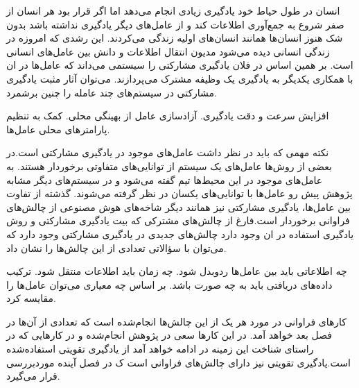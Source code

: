 انسان در طول حیاط خود یادگیری زیادی انجام می‌دهد اما اگر قرار بود هر انسان از  صفر شروع به جمع‌آوری اطلاعات کند و از عامل‌های دیگر یادگیری نداشته باشد بدون شک هنوز انسان‌ها همانند انسان‌های اولیه زندگی می‌کردند. این رشدی که امروزه در زندگی انسانی دیده می‌شود مدیون انتقال اطلاعات و دانش بین عامل‌های انسانی است. بر همین اساس در فلان یادگیری مشارکتی را سیستمی می‌داند که عامل‌ها در ان با همکاری یکدیگر به یادگیری یک وظیفه مشترک می‌پردازند. می‌توان آثار مثبت یادگیری مشارکتی در سیستم‌های چند عامله را چنین برشمرد.

\begin{itemize}\setlength\itemsep{-.5em}
 افزایش سرعت و دقت یادگیری.
 آزادسازی عامل از بهینگی محلی.
 کمک به تنظیم پارامترهای محلی عامل‌ها.
\end{itemize}

نکته مهمی که باید در نظر داشت عامل‌های موجود در یادگیری مشارکتی است.در بعضی از روش‌ها عامل‌های یک سیستم از توانایی‌های متفاوتی برخوردار هستند. به عامل‌های موجود در این محیط‌ها تیم گفته می‌شود و در سیستم‌های دیگر مشابه پژوهش پیش رو عامل‌ها با توانایی‌های یکسان در نظر گرفته می‌شوند. گذشته از تفاوت بین عامل‌ها، یادگیری مشارکتی نیز همانند دیگر شاخه‌های هوش مصنوعی از چالش‌های فراوانی برخوردار است.فارغ از چالش‌های مشترکی که بیت یادگیری مشارکتی و روش یادگیری استفاده در ان وجود دارد چالش‌های جدیدی در یادگیری مشارکتی وجود دارد که می‌توان با سؤالاتی تعدادی از این چالش‌ها را نشان داد.

\begin{itemize}\setlength\itemsep{-.5em}
 چه اطلاعاتی باید بین عامل‌ها ردوبدل شود.
 چه زمان باید اطلاعات منتقل شود.
 ترکیب داده‌های دریافتی باید به چه صورت باشد.
 بر اساس چه معیاری می‌توان عامل‌ها را مقایسه کرد.
\end{itemize}

کارهای فراوانی در مورد هر یک از این چالش‌ها انجام‌شده است که تعدادی از آن‌ها در فصل بعد خواهد آمد. در این کارها سعی در پژوهش انجام‌شده و در کارهایی که در راستای شناخت این زمینه در ادامه خواهد آمد از یادگیری تقویتی استفاده‌شده است.یادگیری تقویتی نیز دارای چالش‌های فراوانی است ک در فصل آینده موردبررسی قرار می‌گیرد.